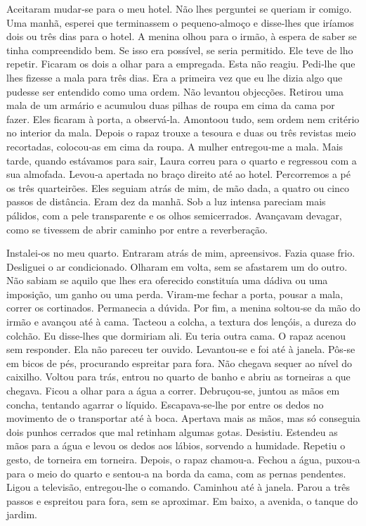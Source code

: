 Aceitaram mudar­‑se para o meu hotel. Não lhes perguntei se queriam ir
comigo. Uma manhã, esperei que terminassem o pequeno­‑almoço e
disse­‑lhes que iríamos dois ou três dias para o hotel. A menina olhou
para o irmão, à espera de saber se tinha compreendido bem. Se isso era
possível, se seria permitido. Ele teve de lho repetir. Ficaram os dois a
olhar para a empregada. Esta não reagiu. Pedi­‑lhe que lhes fizesse a
mala para três dias. Era a primeira vez que eu lhe dizia algo que
pudesse ser entendido como uma ordem. Não levantou objecções. Retirou
uma mala de um armário e acumulou duas pilhas de roupa em cima da cama
por fazer. Eles ficaram à porta, a observá­‑la. Amontoou tudo, sem ordem
nem critério no interior da mala. Depois o rapaz trouxe a tesoura e duas
ou três revistas meio recortadas, colocou­‑as em cima da roupa. A mulher
entregou­‑me a mala. Mais tarde, quando estávamos para sair, Laura
correu para o quarto e regressou com a sua almofada. Levou­‑a apertada
no braço direito até ao hotel. Percorremos a pé os três quarteirões.
Eles seguiam atrás de mim, de mão dada, a quatro ou cinco passos de
distância. Eram dez da manhã. Sob a luz intensa pareciam mais pálidos,
com a pele transparente e os olhos semicerrados. Avançavam devagar, como
se tivessem de abrir caminho por entre a reverberação.

Instalei­‑os no meu quarto. Entraram atrás de mim, apreensivos. Fazia
quase frio. Desliguei o ar condicionado. Olharam em volta, sem se
afastarem um do outro. Não sabiam se aquilo que lhes era oferecido
constituía uma dádiva ou uma imposição, um ganho ou uma perda. Viram­‑me
fechar a porta, pousar a mala, correr os cortinados. Permanecia a
dúvida. Por fim, a menina soltou­‑se da mão do irmão e avançou até à
cama. Tacteou a colcha, a textura dos lençóis, a dureza do colchão. Eu
disse­‑lhes que dormiriam ali. Eu teria outra cama. O rapaz acenou sem
responder. Ela não pareceu ter ouvido. Levantou­‑se e foi até à janela.
Pôs­‑se em bicos de pés, procurando espreitar para fora. Não chegava
sequer ao nível do caixilho. Voltou para trás, entrou no quarto de banho
e abriu as torneiras a que chegava. Ficou a olhar para a água a correr.
Debruçou­‑se, juntou as mãos em concha, tentando agarrar o líquido.
Escapava­‑se­‑lhe por entre os dedos no movimento de o transportar até à
boca. Apertava mais as mãos, mas só conseguia dois punhos cerrados que
mal retinham algumas gotas. Desistiu. Estendeu as mãos para a água e
levou os dedos aos lábios, sorvendo a humidade. Repetiu o gesto, de
torneira em torneira. Depois, o rapaz chamou­‑a. Fechou a água, puxou­‑a
para o meio do quarto e sentou­‑a na borda da cama, com as pernas
pendentes. Ligou a televisão, entregou­‑lhe o comando. Caminhou até à
janela. Parou a três passos e espreitou para fora, sem se aproximar. Em
baixo, a avenida, o tanque do jardim.

